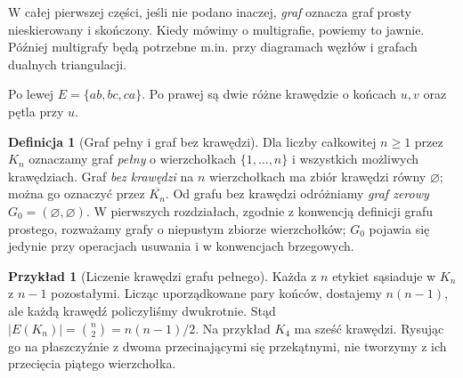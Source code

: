 \documentclass[11pt,a4paper]{report}
\numberwithin{equation}{section}
\theoremstyle{plain}
\theoremstyle{definition}
\newtheorem{definicja}[twierdzenie]{Definicja}
\newtheorem{przyklad}[twierdzenie]{Przykład}
\theoremstyle{remark}
\begin{document}
W całej pierwszej części, jeśli nie podano inaczej, \emph{graf} oznacza
graf prosty nieskierowany i skończony. Kiedy mówimy o multigrafie,
powiemy to jawnie. Później multigrafy będą potrzebne m.in.
przy diagramach węzłów i grafach dualnych triangulacji.

\begin{center}

{\footnotesize Po lewej $E=\{ab,bc,ca\}$. Po prawej są dwie różne
krawędzie o końcach $u,v$ oraz pętla przy $u$.}
\end{center}

\begin{definicja}[Graf pełny i graf bez krawędzi]
Dla liczby całkowitej $n\ge 1$ przez $K_n$ oznaczamy graf
\emph{pełny} o wierzchołkach $\{1,\ldots,n\}$ i wszystkich
możliwych krawędziach. Graf \emph{bez krawędzi} na $n$
wierzchołkach ma zbiór krawędzi równy $\varnothing$;
można go oznaczyć przez $\overline{K_n}$.
Od grafu bez krawędzi odróżniamy \emph{graf zerowy}
$G_0=(\varnothing,\varnothing)$. W pierwszych rozdziałach,
zgodnie z konwencją definicji grafu prostego, rozważamy
grafy o niepustym zbiorze wierzchołków; $G_0$ pojawia się
jedynie przy operacjach usuwania i w konwencjach brzegowych.
\end{definicja}

\begin{przyklad}[Liczenie krawędzi grafu pełnego]
Każda z $n$ etykiet sąsiaduje w $K_n$ z $n-1$ pozostałymi.
Licząc uporządkowane pary końców, dostajemy $n(n-1)$,
ale każdą krawędź policzyliśmy dwukrotnie. Stąd
$|E(K_n)|=\binom n2=n(n-1)/2$.
Na przykład $K_4$ ma sześć krawędzi. Rysując go na płaszczyźnie
z dwoma przecinającymi się przekątnymi, nie tworzymy z ich
przecięcia piątego wierzchołka.
\end{przyklad}
\end{document}
